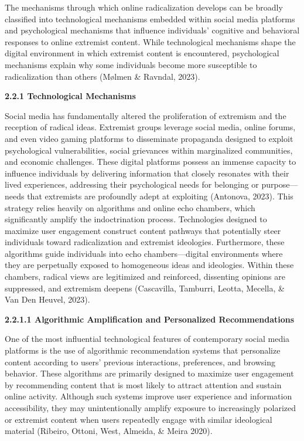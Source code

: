 \documentclass[11pt,a4paper]{article}
\begin{document}
	The mechanisms through which online radicalization develops can be broadly classified into technological mechanisms embedded within social media platforms and psychological mechanisms that influence individuals' cognitive and behavioral responses to online extremist content. While technological mechanisms shape the digital environment in which extremist content is encountered, psychological mechanisms explain why some individuals become more susceptible to radicalization than others (Mølmen \& Ravndal, 2023).
	
	\textbf{2.2.1 Technological Mechanisms}
	
	Social media has fundamentally altered the proliferation of extremism and the reception of radical ideas. Extremist groups leverage social media, online forums, and even video gaming platforms to disseminate propaganda designed to exploit psychological vulnerabilities, social grievances within marginalized communities, and economic challenges. These digital platforms possess an immense capacity to influence individuals by delivering information that closely resonates with their lived experiences, addressing their psychological needs for belonging or purpose---needs that extremists are profoundly adept at exploiting (Antonova, 2023). This strategy relies heavily on algorithms and online echo chambers, which significantly amplify the indoctrination process. Technologies designed to maximize user engagement construct content pathways that potentially steer individuals toward radicalization and extremist ideologies. Furthermore, these algorithms guide individuals into echo chambers---digital environments where they are perpetually exposed to homogeneous ideas and ideologies. Within these chambers, radical views are legitimized and reinforced, dissenting opinions are suppressed, and extremism deepens (Cascavilla, Tamburri, Leotta, Mecella, \& Van Den Heuvel, 2023).
	
	\textbf{2.2.1.1 Algorithmic Amplification and Personalized Recommendations}
	
	One of the most influential technological features of contemporary social media platforms is the use of algorithmic recommendation systems that personalize content according to users' previous interactions, preferences, and browsing behavior. These algorithms are primarily designed to maximize user engagement by recommending content that is most likely to attract attention and sustain online activity. Although such systems improve user experience and information accessibility, they may unintentionally amplify exposure to increasingly polarized or extremist content when users repeatedly engage with similar ideological material (Ribeiro, Ottoni, West, Almeida, \& Meira 2020).
	
\end{document}
